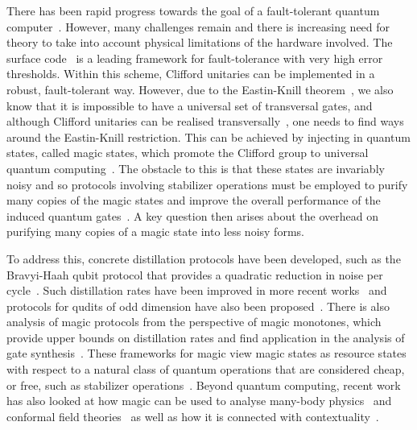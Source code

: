 \documentclass[pra,
aps,
twocolumn,
superscriptaddress,
groupedaddress,
nofootinbib,
reprint
]{revtex4-1}
\begin{document}
There has been rapid progress towards the goal of a fault-tolerant quantum computer~\cite{cit:raussendorf, Raussendorf_2013, Nickerson_2014, Nikahd_2017, chao_2018, lin_pieceable_2020, Lin_2020, Bourassa_2021}. However, many challenges remain and there is increasing need for theory to take into account physical limitations of the hardware involved. The surface code~\cite{Bravyi_1998, Freedman_2001, Dennis_2002, Raussendorf_2007} is a leading framework for fault-tolerance with very high error thresholds. Within this scheme, Clifford unitaries can be implemented in a robust, fault-tolerant way. However, due to the Eastin-Knill theorem~\cite{Eastin_2009}, we also know that it is impossible to have a universal set of transversal gates, and although Clifford unitaries can be realised transversally~\cite{Calderbank_1996, Steane_1996}, one needs to find ways around the Eastin-Knill restriction. This can be achieved by injecting in quantum states, called magic states, which promote the Clifford group to universal quantum computing~\cite{cit:bravyi}. The obstacle to this is that these states are invariably noisy and so protocols involving stabilizer operations must be employed to purify many copies of the magic states and improve the overall performance of the induced quantum gates~\cite{cit:bravyi, Jones_2013, Ogorman_2017}. A key question then arises about the overhead on purifying many copies of a magic state into less noisy forms. 

To address this, concrete distillation protocols have been developed, such as the Bravyi-Haah qubit protocol that provides a quadratic reduction in noise per cycle~\cite{Bravyi2012}. Such distillation rates have been improved in more recent works~\cite{Jones_2013, haah2017magic, Hastings2018, Litinski_2019} and protocols for qudits of odd dimension have also been proposed~\cite{Anwar_2012, CampbellAnwar_2012, Dawkins_2015, Krishna2019, cit:prakash}. There is also analysis of magic protocols from the perspective of magic monotones, which provide upper bounds on distillation rates and find application in the analysis of gate synthesis~\cite{Campbell_2017, Howard_2017, Prakash_2018, Seddon_2021}. These frameworks for magic view magic states as resource states with respect to a natural class of quantum operations that are considered cheap, or free, such as stabilizer operations~\cite{Gour_2019, cit:ahmadi, cit:seddon, Wang_2019}. Beyond quantum computing, recent work has also looked at how magic can be used to analyse many-body physics~\cite{Sarkar_2020} and conformal field theories~\cite{White_2021} as well as how it is connected with contextuality~\cite{Vega_2017, cit:howard2, Zurel_2020, okay2021extremal}.
\end{document}
